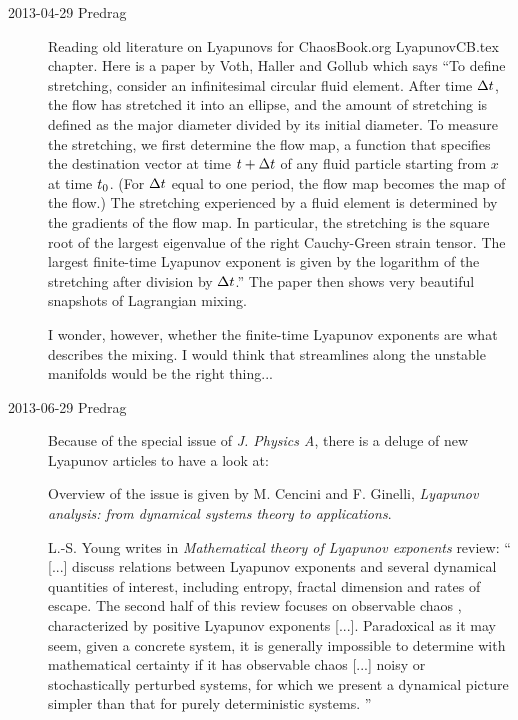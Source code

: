 \begin{description}
\item[2013-04-29 Predrag]                       \toCB
Reading old literature on Lyapunovs for ChaosBook.org LyapunovCB.tex
chapter. Here is a paper by Voth, Haller and Gollub which says
``To define stretching, consider an infinitesimal circular fluid element.
After time $\Delta t$, the flow has stretched it into an ellipse, and
the amount of stretching is defined as the major diameter divided by its
initial diameter. To measure the stretching, we first determine the flow
map, a function that specifies the destination vector at time $t+
\Delta t$ of any fluid particle starting from $x$ at time $t_0$.
(For $\Delta t$ equal to one period,  the flow map becomes the
\Poincare map of the flow.) The stretching experienced by a fluid
element is determined by the gradients of the flow map. In particular,
the stretching is the square root of the largest eigenvalue of the right
Cauchy-Green strain tensor. The largest finite-time Lyapunov exponent is
given by the logarithm of the stretching after division by $\Delta
t$.'' The paper then shows very beautiful snapshots of Lagrangian
mixing.

I wonder, however, whether the finite-time Lyapunov exponents are what
describes the mixing. I would think that streamlines along the unstable
manifolds would be the right thing...

\item[2013-06-29 Predrag] Because of the special issue of \emph{J. Physics A},
there is a deluge of new Lyapunov articles to have a look at:

Overview of the issue is given by
M. Cencini and F. Ginelli,
{\em Lyapunov analysis: from dynamical systems theory to applications}.

L.-S. Young writes in {\em Mathematical theory of {Lyapunov}
exponents} review: ``
[...] discuss relations between Lyapunov exponents
and several dynamical quantities of interest, including entropy, fractal
dimension and rates of escape. The second half of this review focuses on
observable chaos , characterized by positive Lyapunov exponents  [...].
Paradoxical as it may seem, given a concrete system, it is generally
impossible to determine with mathematical certainty if it has observable
chaos  [...] noisy or stochastically perturbed
systems, for which we present a dynamical picture simpler than that for
purely deterministic systems. ''


\end{description}
